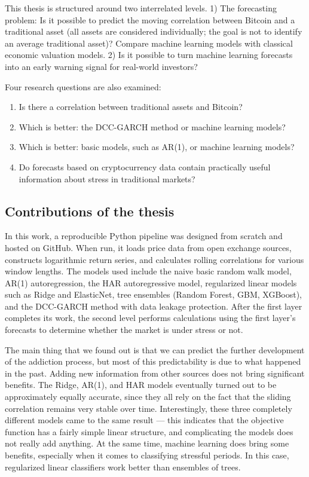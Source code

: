 This thesis is structured around two interrelated levels.
1) The forecasting problem: Is it possible to predict the moving correlation between Bitcoin and a traditional asset (all assets are considered individually; the goal is not to identify an average traditional asset)? Compare machine learning models with classical economic valuation models.
2) Is it possible to turn machine learning forecasts into an early warning signal for real-world investors?

Four research questions are also examined:

\begin{enumerate}
\item Is there a correlation between traditional assets and Bitcoin?
    \item Which is better: the DCC-GARCH method or machine learning models?
    \item Which is better: basic models, such as AR(1), or machine learning models?
    \item Do forecasts based on cryptocurrency data contain practically useful information about stress in traditional markets?
\end{enumerate}

\subsection{Contributions of the thesis}

In this work, a reproducible Python pipeline was designed from scratch and hosted on GitHub. When run, it loads price data from open exchange sources, constructs logarithmic return series, and calculates rolling correlations for various window lengths. The models used include the naive basic random walk model, AR(1) autoregression, the HAR autoregressive model, regularized linear models such as Ridge and ElasticNet, tree ensembles (Random Forest, GBM, XGBoost), and the DCC-GARCH method with data leakage protection. After the first layer completes its work, the second level performs calculations using the first layer's forecasts to determine whether the market is under stress or not.

The main thing that we found out is that we can predict the further development of the addiction process, but most of this predictability is due to what happened in the past. Adding new information from other sources does not bring significant benefits. The Ridge, AR(1), and HAR models eventually turned out to be approximately equally accurate, since they all rely on the fact that the sliding correlation remains very stable over time. Interestingly, these three completely different models came to the same result — this indicates that the objective function has a fairly simple linear structure, and complicating the models does not really add anything. At the same time, machine learning does bring some benefits, especially when it comes to classifying stressful periods. In this case, regularized linear classifiers work better than ensembles of trees.

